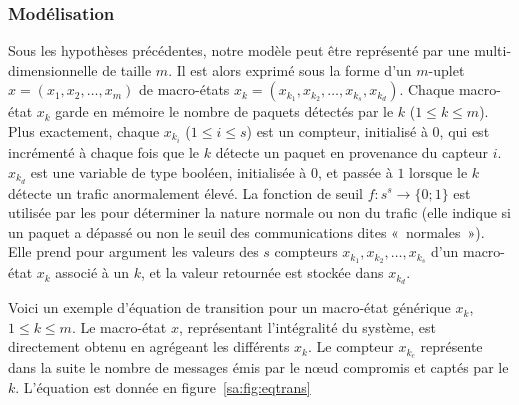         \subsubsection{Modélisation}
Sous les hypothèses précédentes, notre modèle peut être représenté par une \cmtc multi-dimensionnelle de taille $m$.
Il est alors exprimé sous la forme d'un $m$-uplet $x\!=\!(x_1,x_2,\dots,x_m)$ de macro-états $x_k\!=\!(x_{k_1},x_{k_2},\dots,x_{k_s},x_{k_d})$.
Chaque macro-état $x_k$    garde en mémoire le nombre de paquets détectés par le \cn $k$ ($1\leq k\leq m$).
Plus exactement, chaque $x_{k_i}$ ($1\leq i\leq s$) est un compteur, initialisé à $0$, qui est incrémenté à chaque fois que le \cn $k$ détecte un paquet en provenance du capteur $i$.
$x_{k_d}$ est une variable de type booléen, initialisée à $0$, et passée à $1$ lorsque le \cn $k$ détecte un trafic anormalement élevé.
La fonction de seuil $f:s^s\rightarrow\{0;1\}$ est utilisée par les \cns pour déterminer la nature normale ou non du trafic (elle indique si un paquet a dépassé ou non le seuil des communications dites «~normales~»).
Elle prend pour argument les valeurs des $s$ compteurs $x_{k_1},x_{k_2},\dots,x_{k_s}$ d'un macro-état $x_k$ associé à un \cn $k$, et la valeur retournée est stockée dans $x_{k_d}$.

Voici un exemple d'équation de transition pour un macro-état générique $x_k$, $1\leq k\leq m$.
Le macro-état $x$, représentant l'intégralité du système, est directement obtenu en agrégeant les différents $x_k$.
Le compteur $x_{k_c}$ représente dans la suite le nombre de messages émis par le nœud compromis et captés par le \cn $k$.
L'équation est donnée en figure~\ref{sa:fig:eqtrans}

\newlength{\fboxlinelen}
\setlength{\fboxlinelen}{\linewidth}
\addtolength{\fboxlinelen}{-4\fboxsep}
\addtolength{\fboxlinelen}{-2\fboxrule}

